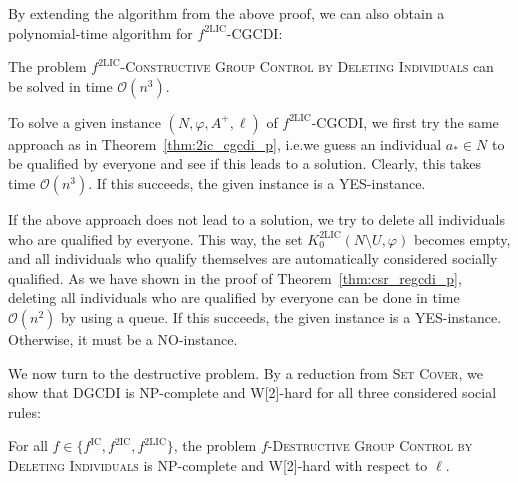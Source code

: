 \documentclass[
    12pt,               %
    a4paper,            %
    bibtotoc,           %
    pointlessnumbers,   %
    ngerman,            %
    titlepage,          %
    leqno,              %
    ]{scrarticle}       %
\newcommand\thmref{Theorem~\ref}
\begin{document}
By extending the algorithm from the above proof, we can also obtain a polynomial-time algorithm for $f^{\text{2LIC}}$-CGCDI:

\begin{Corollary} \label{cor:2lic_cgcdi_p}
The problem $f^{\text{2LIC}}$-\textsc{Constructive Group Control by Deleting Individuals} can be solved in time $\mathcal{O}(n^3)$.
\end{Corollary}

\begin{Proof}
To solve a given instance $(N, \varphi, A^+, \ell)$ of $f^{\text{2LIC}}$-CGCDI, we first try the same approach as in \thmref{thm:2ic_cgcdi_p}, i.e.\@ we guess an individual $a_\ast \in N$ to be qualified by everyone and see if this leads to a solution. Clearly, this takes time $\mathcal{O}(n^3)$. If this succeeds, the given instance is a YES-instance.

If the above approach does not lead to a solution, we try to delete all individuals who are qualified by everyone. This way, the set $K^{\text{2LIC}}_0(N \setminus U, \varphi)$ becomes empty, and all individuals who qualify themselves are automatically considered socially qualified. As we have shown in the proof of \thmref{thm:csr_regcdi_p}, deleting all individuals who are qualified by everyone can be done in time $\mathcal{O}(n^2)$ by using a queue. If this succeeds, the given instance is a YES-instance. Otherwise, it must be a NO-instance.
\end{Proof}



We now turn to the destructive problem. By a reduction from \textsc{Set Cover}, we show that DGCDI is NP-complete and W[2]-hard for all three considered social rules:

\begin{Theorem} \label{thm:ic_dgcdi_npc}
For all $f \in \{ f^{\text{IC}}, f^{\text{2IC}}, f^{\text{2LIC}} \}$, the problem $f$-\textsc{Destructive Group Control by Deleting Individuals} is NP-complete and W[2]-hard with respect to $\ell$.
\end{Theorem}
\end{document}
